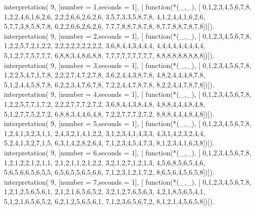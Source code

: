 interpretation( 9, [number = 1,seconds = 1], [
    function(*(_,_), [
        0,1,2,3,4,5,6,7,8,
        1,2,2,4,6,1,6,2,6,
        2,2,2,6,6,2,6,2,6,
        3,5,7,3,3,5,8,7,8,
        4,1,2,4,4,1,6,2,6,
        5,7,7,3,8,5,8,7,8,
        6,2,2,6,6,2,6,2,6,
        7,7,7,8,8,7,8,7,8,
        8,7,7,8,8,7,8,7,8])]).
interpretation( 9, [number = 2,seconds = 1], [
    function(*(_,_), [
        0,1,2,3,4,5,6,7,8,
        1,2,2,5,7,2,1,2,2,
        2,2,2,2,2,2,2,2,2,
        3,6,8,4,4,3,4,4,4,
        4,4,4,4,4,4,4,4,4,
        5,1,2,7,7,5,7,7,7,
        6,8,8,3,4,8,6,8,8,
        7,7,7,7,7,7,7,7,7,
        8,8,8,8,8,8,8,8,8])]).
interpretation( 9, [number = 3,seconds = 1], [
    function(*(_,_), [
        0,1,2,3,4,5,6,7,8,
        1,2,2,5,4,7,1,7,8,
        2,2,2,7,4,7,2,7,8,
        3,6,2,4,4,3,8,7,8,
        4,8,2,4,4,4,8,7,8,
        5,1,2,4,4,5,8,7,8,
        6,2,2,3,4,7,6,7,8,
        7,2,2,4,4,7,8,7,8,
        8,2,2,4,4,7,8,7,8])]).
interpretation( 9, [number = 4,seconds = 1], [
    function(*(_,_), [
        0,1,2,3,4,5,6,7,8,
        1,2,2,5,7,7,1,7,2,
        2,2,2,7,7,7,2,7,2,
        3,6,8,4,4,3,8,4,8,
        4,8,8,4,4,4,8,4,8,
        5,1,2,7,7,5,2,7,2,
        6,8,8,3,4,4,6,4,8,
        7,2,2,7,7,7,2,7,2,
        8,8,8,4,4,4,8,4,8])]).
interpretation( 9, [number = 5,seconds = 1], [
    function(*(_,_), [
        0,1,2,3,4,5,6,7,8,
        1,2,4,1,3,2,3,1,1,
        2,4,3,2,1,4,1,2,2,
        3,1,2,3,4,1,4,3,3,
        4,3,1,4,2,3,2,4,4,
        5,2,4,1,3,2,7,1,5,
        6,3,1,4,2,8,2,6,4,
        7,1,2,3,4,5,4,7,3,
        8,1,2,3,4,1,6,3,8])]).
interpretation( 9, [number = 6,seconds = 1], [
    function(*(_,_), [
        0,1,2,3,4,5,6,7,8,
        1,2,1,2,2,1,2,1,1,
        2,1,2,1,1,2,1,2,2,
        3,2,1,2,7,1,2,1,3,
        4,5,6,8,5,6,5,4,6,
        5,6,5,6,6,5,6,5,5,
        6,5,6,5,5,6,5,6,6,
        7,1,2,3,1,2,1,7,2,
        8,6,5,6,4,5,6,5,8])]).
interpretation( 9, [number = 7,seconds = 1], [
    function(*(_,_), [
        0,1,2,3,4,5,6,7,8,
        1,2,1,2,5,6,5,6,1,
        2,1,2,1,6,5,6,5,2,
        3,2,1,2,7,6,5,6,3,
        4,2,1,8,5,6,5,4,1,
        5,1,2,1,6,5,6,5,2,
        6,2,1,2,5,6,5,6,1,
        7,1,2,3,6,5,6,7,2,
        8,1,2,1,4,5,6,5,8])]).
